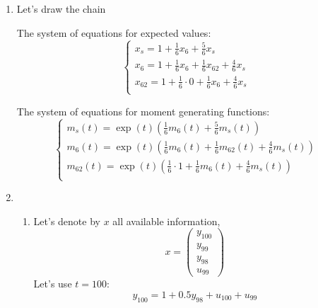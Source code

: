 \begin{enumerate}
\item Let's draw the chain

\begin{center}
\end{center}

The system of equations for expected values:
\[
\begin{cases}
x_s = 1 + \frac{1}{6} x_6 + \frac{5}{6} x_s \\
x_6 = 1 + \frac{1}{6} x_6 + \frac{1}{6} x_{62}  + \frac{4}{6} x_s \\
x_{62} = 1 + \frac{1}{6} \cdot 0 + \frac{1}{6} x_{6}  + \frac{4}{6} x_s \\
\end{cases}    
\]


The system of equations for moment generating functions:
\[
\begin{cases}
m_s(t) = \exp(t) \left(\frac{1}{6} m_6(t) + \frac{5}{6} m_s(t)\right) \\
m_6(t) = \exp(t) \left( \frac{1}{6} m_6(t) + \frac{1}{6} m_{62}(t)  + \frac{4}{6} m_s(t)\right) \\
m_{62}(t) = \exp(t) \left( \frac{1}{6} \cdot 1 + \frac{1}{6} m_{6}(t)  + \frac{4}{6} m_s(t) \right)\\
\end{cases}    
\]


\item \begin{enumerate}
    \item Let's denote by $x$ all available information, 
    \[
    x = \begin{pmatrix}
        y_{100} \\
        y_{99} \\
        y_{98} \\
        u_{99}
    \end{pmatrix}    
    \]
    Let's use $t=100$:
    \[
    y_{100} = 1 + 0.5 y_{98} + u_{100} + u_{99}    
    \]


\end{enumerate}
\end{enumerate}
